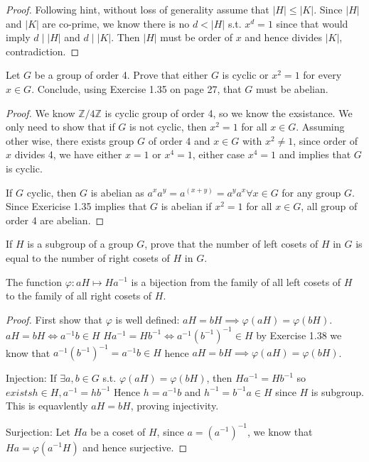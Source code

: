 \documentclass[15pt]{article}
\newenvironment{exercise}[2][Exercise]{\begin{trivlist}
\item[\hskip \labelsep {\bfseries #1}\hskip \labelsep {\bfseries #2.}]}
{\end{trivlist}}
\newenvironment{hint}[2][Hint]{\begin{trivlist}
    \item[\hskip \labelsep {\bfseries #1}\hskip \labelsep {\bfseries #2.}]}
    {\end{trivlist}}
\begin{document}
\begin{proof}
    Following hint, without loss of generality assume that $|H| \leq |K|$. Since $|H|$ and $|K|$ are co-prime, 
    we know there is no $d< |H|$ s.t. $x^d=1$ since that would imply $d\mid |H|$ and $d\mid |K|$. Then $|H|$ must
    be order of $x$ and hence divides $|K|$, contradiction. 
\end{proof}




\begin{exercise}{1.43}
    Let $G$ be a group of order 4. Prove that either $G$ is cyclic or $x^2=1$ for every $x\in G$. Conclude,
    using Exercise 1.35 on page 27, that $G$ must be abelian.
\end{exercise}

\begin{proof}
    We know $\mathbb {Z} / 4\mathbb {Z}$ is cyclic group of order 4, so we know the exsistance. We only need to show that
    if $G$ is not cyclic, then $x^2=1$ for all $x\in G$. Assuming other wise, there exists group $G$ of order 4 and 
    $x\in G$ with $x^2\neq 1$, since order of $x$ divides 4, we have either $x=1$ or $x^4=1$, either case $x^4=1$ and implies
    that $G$ is cyclic. 

    If $G$ cyclic, then $G$ is abelian as $a^xa^y=a^(x+y)=a^ya^x \forall x\in G$ for any group $G$. Since Exericise 1.35 implies 
    that $G$ is abelian if $x^2=1$ for all $x\in G$, all group of order 4 are abelian.
\end{proof}



\begin{exercise}{1.44}
    If $H$ is a subgroup of a group $G$, prove that the number of left cosets of $H$ in $G$ is equal to the number of right
    cosets of $H$ in $G$.
    \begin{hint}{}
        The function $\varphi: aH \mapsto Ha^{-1}$ is a bijection from the family of all left cosets of $H$
        to the family of all right cosets of $H$.
    \end{hint}

\end{exercise}

\begin{proof}
    
    First show that $\varphi$ is well defined: $aH=bH \implies \varphi(aH)=\varphi(bH)$. $aH=bH \iff a^{-1}b\in H$
    $Ha^{-1} = Hb^{-1} \iff a^{-1}(b^{-1})^{-1} \in H$ by Exercise 1.38 we know that $a^{-1}(b^{-1})^{-1} = a^{-1}b \in H$
    hence $aH=bH \implies \varphi(aH)=\varphi(bH)$.

    Injection: If $ \exists a,b\in G$ s.t. $\varphi(aH) = \varphi(bH)$, then $Ha^{-1} = Hb^{-1}$ so $exists h \in H, a^{-1} = hb^{-1}$
    Hence $h=a^{-1}b$ and $h^{-1} = b^{-1}a \in H$ since $H$ is subgroup. This is equavlently $aH=bH$, proving injectivity.

    Surjection: Let $Ha$ be a coset of $H$, since $a=(a^{-1})^{-1}$, we know that $Ha = \varphi(a^{-1}H)$ and hence surjective.

\end{proof}
    
\end{document}
